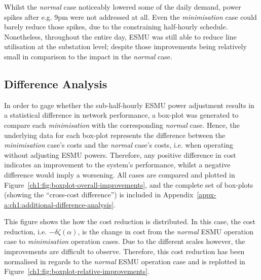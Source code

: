 

Whilst the \textit{normal} case noticeably lowered some of the daily demand, power spikes after e.g. 9pm were not addressed at all.
Even the \textit{minimisation} case could barely reduce those spikes, due to the constraining half-hourly schedule.
Nonetheless, throughout the entire day, ESMU was still able to reduce line utilisation at the substation level; despite those improvements being relatively small in comparison to the impact in the \textit{normal} case.

\subsection{Difference Analysis}
\label{ch1:subsec:difference-analysis}

In order to gage whether the sub-half-hourly ESMU power adjustment results in a statistical difference in network performance, a box-plot was generated to compare each \textit{minimisation} with the corresponding \textit{normal} case.
Hence, the underlying data for each box-plot represents the difference between the \textit{minimisation} case's costs and the \textit{normal} case's costs, i.e. when operating without adjusting ESMU powers.
Therefore, any positive difference in cost indicates an improvement to the system's performance, whilst a negative difference would imply a worsening.
All cases are compared and plotted in Figure~\ref{ch1:fig:boxplot-overall-improvements}, and the complete set of box-plots (showing the ``cross-cost difference'') is included in Appendix~\ref{appx-a:ch1:additional-difference-analysis}.



This figure shows the how the cost reduction is distributed.
In this case, the cost reduction, i.e. $-\delta\zeta(\alpha)$, is the change in cost from the \textit{normal} ESMU operation case to \textit{minimisation} operation cases.
Due to the different scales however, the improvements are difficult to observe.
Therefore, this cost reduction has been normalised in regards to the \textit{normal} ESMU operation case and is replotted in Figure~\ref{ch1:fig:boxplot-relative-improvements}.



